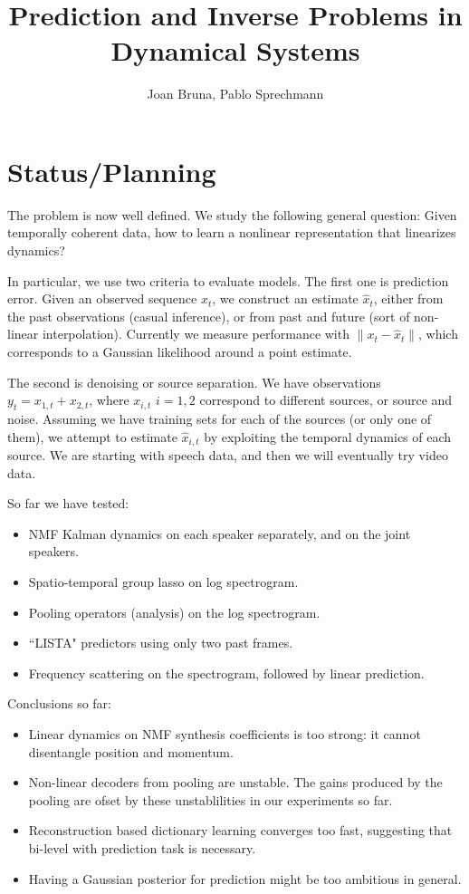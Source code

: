 \documentclass[11pt]{article} %
\title{Prediction and Inverse Problems in Dynamical Systems}
\author{Joan Bruna, Pablo Sprechmann}
\begin{document}
\maketitle


\section{Status/Planning}

The problem is now well defined. 
We study the following general question: Given temporally coherent data, how to learn 
a nonlinear representation that linearizes dynamics? 

In particular, we use two criteria to evaluate models. 
The first one is prediction error. Given an observed sequence $x_t$, we construct an 
estimate $\hat{x}_t$, either from the past observations (casual inference), or from past and future (sort of 
non-linear interpolation). Currently we measure performance with $\| x_t - \hat{x}_t \|$, which 
corresponds to a Gaussian likelihood around a point estimate. 

The second is denoising or source separation. We have observations $y_t = x_{1,t} + x_{2,t}$, where
$x_{i,t}$ $i=1,2$ correspond to different sources, or source and noise. Assuming we have training sets for 
each of the sources (or only one of them), we attempt to estimate $\hat{x}_{i,t}$ by exploiting the temporal 
dynamics of each source. 
We are starting with speech data, and then we will eventually try video data.

So far we have tested:
\begin{itemize}
\item NMF Kalman dynamics on each speaker separately, and on the joint speakers. 
\item Spatio-temporal group lasso on log spectrogram.
\item Pooling operators (analysis) on the log spectrogram.
\item ``LISTA" predictors using only two past frames.
\item Frequency scattering on the spectrogram, followed by linear prediction. 
\end{itemize}

Conclusions so far:
\begin{itemize}
\item Linear dynamics on NMF synthesis coefficients is too strong: it cannot disentangle position and momentum.
\item Non-linear decoders from pooling are unstable. The gains produced by the pooling are ofset by these unstablilities in our experiments so far.
\item Reconstruction based dictionary learning converges too fast, suggesting that bi-level with prediction task is necessary.
\item Having a Gaussian posterior for prediction might be too ambitious in general. 
\end{itemize}
\end{document}

